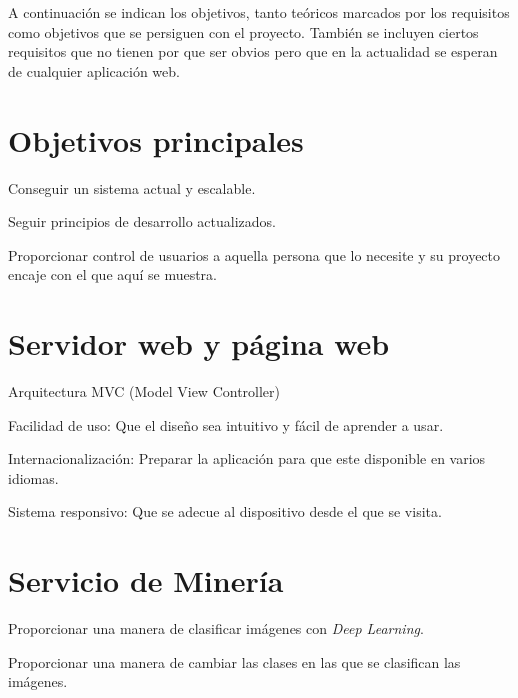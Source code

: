 
A continuación se indican los objetivos, tanto teóricos marcados por los requisitos como objetivos que se persiguen con el proyecto. También se incluyen ciertos requisitos que no tienen por que ser obvios pero que en la actualidad se esperan de cualquier aplicación web.



\section{Objetivos principales} 
\begin{list}{-}{}
\item Conseguir un sistema actual y escalable.
\item Seguir principios de desarrollo actualizados.
\item Proporcionar control de usuarios a aquella persona que lo necesite y su proyecto encaje con el que aquí se muestra.
\end{list}

\section{Servidor web y página web}
\begin{list}{-}{}
\item Arquitectura MVC (Model View Controller)
\item Facilidad de uso: Que el diseño sea intuitivo y fácil de aprender a usar.
\item Internacionalización: Preparar la aplicación para que este disponible en varios idiomas.
\item Sistema responsivo: Que se adecue al dispositivo desde el que se visita.
\end{list}

\section{Servicio de Minería}
\begin{list}{-}{}
\item Proporcionar una manera de clasificar imágenes con \emph{Deep Learning}.
\item Proporcionar una manera de cambiar las clases en las que se clasifican las imágenes.
\end{list}

